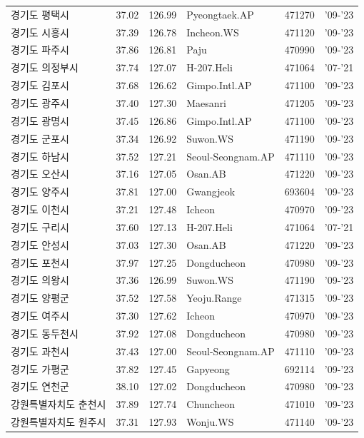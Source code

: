 \begin{longtable}{lcclcc}
  경기도 평택시 & 37.02 & 126.99 & Pyeongtaek.AP & 471270 & '09-'23 \\
  경기도 시흥시 & 37.39 & 126.78 & Incheon.WS & 471120 & '09-'23 \\
  경기도 파주시 & 37.86 & 126.81 & Paju & 470990 & '09-'23 \\
  경기도 의정부시 & 37.74 & 127.07 & H-207.Heli & 471064 & '07-'21 \\
  경기도 김포시 & 37.68 & 126.62 & Gimpo.Intl.AP & 471100 & '09-'23 \\
  경기도 광주시 & 37.40 & 127.30 & Maesanri & 471205 & '09-'23 \\
  경기도 광명시 & 37.45 & 126.86 & Gimpo.Intl.AP & 471100 & '09-'23 \\
  경기도 군포시 & 37.34 & 126.92 & Suwon.WS & 471190 & '09-'23 \\
  경기도 하남시 & 37.52 & 127.21 & Seoul-Seongnam.AP & 471110 & '09-'23 \\
  경기도 오산시 & 37.16 & 127.05 & Osan.AB & 471220 & '09-'23 \\
  경기도 양주시 & 37.81 & 127.00 & Gwangjeok & 693604 & '09-'23 \\
  경기도 이천시 & 37.21 & 127.48 & Icheon & 470970 & '09-'23 \\
  경기도 구리시 & 37.60 & 127.13 & H-207.Heli & 471064 & '07-'21 \\
  경기도 안성시 & 37.03 & 127.30 & Osan.AB & 471220 & '09-'23 \\
  경기도 포천시 & 37.97 & 127.25 & Dongducheon & 470980 & '09-'23 \\
  경기도 의왕시 & 37.36 & 126.99 & Suwon.WS & 471190 & '09-'23 \\
  경기도 양평군 & 37.52 & 127.58 & Yeoju.Range & 471315 & '09-'23 \\
  경기도 여주시 & 37.30 & 127.62 & Icheon & 470970 & '09-'23 \\
  경기도 동두천시 & 37.92 & 127.08 & Dongducheon & 470980 & '09-'23 \\
  경기도 과천시 & 37.43 & 127.00 & Seoul-Seongnam.AP & 471110 & '09-'23 \\
  경기도 가평군 & 37.82 & 127.45 & Gapyeong & 692114 & '09-'23 \\
  경기도 연천군 & 38.10 & 127.02 & Dongducheon & 470980 & '09-'23 \\
  강원특별자치도 춘천시 & 37.89 & 127.74 & Chuncheon & 471010 & '09-'23 \\
  강원특별자치도 원주시 & 37.31 & 127.93 & Wonju.WS & 471140 & '09-'23 \\

\end{longtable}
